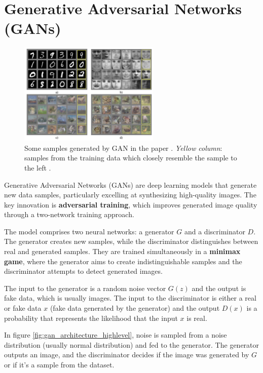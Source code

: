 \section{Generative Adversarial Networks (GANs)}
\label{sec:gan}

\begin{figure}
    \centering
    \includegraphics[width=0.6\textwidth]{images/gan/gan_samples.png}
    \caption{Some samples generated by GAN in the paper \cite{gan}. \textit{Yellow column}: samples from the training data which closely resemble the sample to the left \cite{gan}.}
\end{figure}

Generative Adversarial Networks (GANs) \cite{gan} are deep learning models that generate new data samples, particularly excelling at synthesizing high-quality images. The key innovation is \textbf{adversarial training}, which improves generated image quality through a two-network training approach.

The model comprises two neural networks: a generator $G$ and a discriminator $D$. The generator creates new samples, while the discriminator distinguishes between real and generated samples. They are trained simultaneously in a \textbf{minimax game}, where the generator aims to create indistinguishable samples and the discriminator attempts to detect generated images. 

The input to the generator is a random noise vector $G(z)$ and the output is fake data, which is usually images. The input to the discriminator is either a real or fake data $x$ (fake data generated by the generator) and the output $D(x)$ is a probability that represents the likelihood that the input $x$ is real.



In figure \ref{fig:gan_architecture_highlevel}, noise is sampled from a noise distribution (usually normal distribution) and fed to the generator. The generator outputs an image, and the discriminator decides if the image was generated by $G$ or if it's a sample from the dataset.

